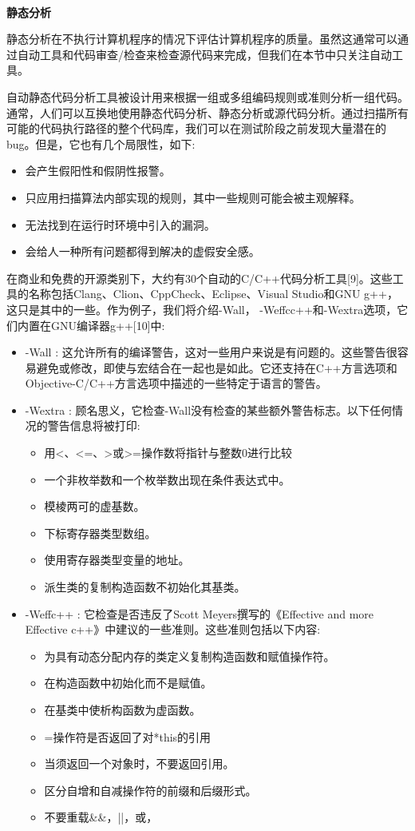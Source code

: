 \noindent\textbf{}\ \par
\textbf{静态分析} \ \par
静态分析在不执行计算机程序的情况下评估计算机程序的质量。虽然这通常可以通过自动工具和代码审查/检查来检查源代码来完成，但我们在本节中只关注自动工具。 \par
自动静态代码分析工具被设计用来根据一组或多组编码规则或准则分析一组代码。通常，人们可以互换地使用静态代码分析、静态分析或源代码分析。通过扫描所有可能的代码执行路径的整个代码库，我们可以在测试阶段之前发现大量潜在的bug。但是，它也有几个局限性，如下: \par
\begin{itemize}
	\item 会产生假阳性和假阴性报警。
	\item 只应用扫描算法内部实现的规则，其中一些规则可能会被主观解释。
	\item 无法找到在运行时环境中引入的漏洞。
	\item 会给人一种所有问题都得到解决的虚假安全感。
\end{itemize}

在商业和免费的开源类别下，大约有30个自动的C/C++代码分析工具[9]。这些工具的名称包括Clang、Clion、CppCheck、Eclipse、Visual Studio和GNU g++，这只是其中的一些。作为例子，我们将介绍-Wall， -Weffcc++和-Wextra选项，它们内置在GNU编译器g++[10]中: \par
\begin{itemize}
	\item -Wall : 这允许所有的编译警告，这对一些用户来说是有问题的。这些警告很容易避免或修改，即使与宏结合在一起也是如此。它还支持在C++方言选项和Objective-C/C++方言选项中描述的一些特定于语言的警告。
	\item -Wextra : 顾名思义，它检查-Wall没有检查的某些额外警告标志。以下任何情况的警告信息将被打印:
	\begin{itemize}
		\item 用<、<=、>或>=操作数将指针与整数0进行比较
		\item 一个非枚举数和一个枚举数出现在条件表达式中。
		\item 模棱两可的虚基数。
		\item 下标寄存器类型数组。
		\item 使用寄存器类型变量的地址。
		\item 派生类的复制构造函数不初始化其基类。
	\end{itemize}
	\item -Weffc++ : 它检查是否违反了Scott Meyers撰写的《Effective and more Effective c++》中建议的一些准则。这些准则包括以下内容:
	\begin{itemize}
		\item 为具有动态分配内存的类定义复制构造函数和赋值操作符。
		\item 在构造函数中初始化而不是赋值。
		\item 在基类中使析构函数为虚函数。
		\item =操作符是否返回了对*this的引用
		\item 当须返回一个对象时，不要返回引用。
		\item 区分自增和自减操作符的前缀和后缀形式。
		\item 不要重载\&\&，||，或，
	\end{itemize}
\end{itemize}

